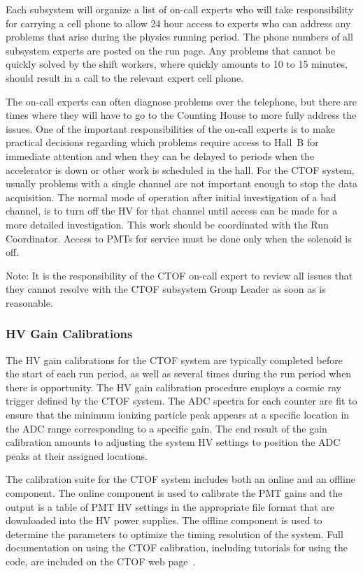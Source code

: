 \documentclass[12pt]{article}
\begin{document}
Each subsystem will organize a list of on-call experts who will take responsibility for carrying
a cell phone to allow 24 hour access to experts who can address any problems that arise during
the physics running period. The phone numbers of all subsystem experts are posted on the run page. 
Any problems that cannot be quickly solved by the shift workers, where quickly amounts to 10 to 15 
minutes, should result in a call to the relevant expert cell phone. 

The on-call experts can often diagnose problems over the telephone, but there are times where they
will have to go to the Counting House to more fully address the issues. One of the important
responsibilities of the on-call experts is to make practical decisions regarding which problems 
require access to Hall~B for immediate attention and when they can be delayed to periods when the 
accelerator is down or other work is scheduled in the hall. For the CTOF system, usually problems 
with a single channel are not important enough to stop the data acquisition. The normal mode of 
operation after initial investigation of a bad channel, is to turn off the HV for that channel 
until access can be made for a more detailed investigation. This work should be coordinated with
the Run Coordinator. Access to PMTs for service must be done only when the solenoid is off.

Note: It is the responsibility of the CTOF on-call expert to review all issues that they cannot
resolve with the CTOF subsystem Group Leader as soon as is reasonable.

\subsubsection{HV Gain Calibrations}
\label{gain-calib}

The HV gain calibrations for the CTOF system are typically completed before the start of each run
period, as well as several times during the run period when there is opportunity. The HV gain 
calibration procedure employs a cosmic ray trigger defined by the CTOF system. The ADC spectra for 
each counter are fit to ensure that the minimum ionizing particle peak appears at a specific 
location in the ADC range corresponding to a specific gain. The end result of the gain calibration 
amounts to adjusting the system HV settings to position the ADC peaks at their assigned locations.

The calibration suite for the CTOF system includes both an online and an offline component. The
online component is used to calibrate the PMT gains and the output is a table of PMT HV settings
in the appropriate file format that are downloaded into the HV power supplies. The offline component 
is used to determine the parameters to optimize the timing resolution of the system. Full 
documentation on using the CTOF calibration, including tutorials for using the code, are included 
on the CTOF web page~\cite{ctof-web}.
\end{document}
